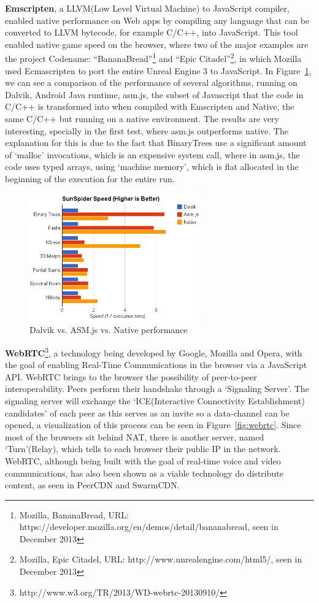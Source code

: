 \textbf{Emscripten}\cite{Zakai2011}, a LLVM(Low Level Virtual Machine) to JavaScript compiler, enabled native performance on Web apps by compiling any language that can be converted to LLVM bytecode, for example C/C++, into JavaScript. This tool enabled native game speed on the browser, where two of the major examples are the project Codename: ``BananaBread''\footnote{Mozilla, BananaBread,  URL: https://developer.mozilla.org/en/demos/detail/bananabread, seen in December 2013} and ``Epic Citadel''\footnote{Mozilla, Epic Citadel,  URL: http://www.unrealengine.com/html5/, seen in December 2013}, in which Mozilla used Ecmascripten to port the entire Unreal Engine 3 to JavaScript. In Figure~\ref{fig:dan}, we can see a comparison of the performance of several algorithms, running on Dalvik, Android Java runtime, asm.js, the subset of Javascript that the code in C/C++ is transformed into when compiled with Emscripten and Native, the same C/C++ but running on a native environment. The results are very interesting, specially in the first test, where asm.js outperforms native. The explanation for this is due to the fact that BinaryTrees use a significant amount of `malloc' invocations, which is an expensive system call, where in asm.js, the code uses typed arrays, using `machine memory', which is flat allocated in the beginning of the execution for the entire run.

\begin{figure}[h!]
  \centering
  \includegraphics[width=0.65\textwidth]{img/Dalvik-vs-ASM-vs-Native-edited}
  \caption{Dalvik vs. ASM.js vs. Native performance}
  \label{fig:dan}
\end{figure}

\textbf{WebRTC}\footnote{http://www.w3.org/TR/2013/WD-webrtc-20130910/}, a technology being developed by Google, Mozilla and Opera, with the goal of enabling Real-Time Communications in the browser via a JavaScript API. WebRTC brings to the browser the possibility of peer-to-peer interoperability. Peers perform their handshake through a `Signaling Server'. The signaling server will exchange the `ICE(Interactive Connectivity Establishment) candidates' of each peer as this serves as an invite so a data-channel can be opened, a visualization of this process can be seen in Figure~\ref{fig:webrtc}. Since most of the browsers sit behind NAT, there is another server, named `Turn'(Relay), which tells to each browser their public IP in the network. WebRTC, although being built with the goal of real-time voice and video communications, has also been shown as a viable technology do distribute content, as seen in PeerCDN and SwarmCDN\cite{Vogt}.

